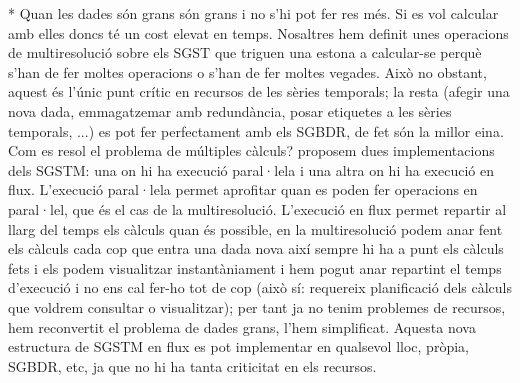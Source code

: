 * Quan les dades són grans són grans i no s'hi pot fer res més. Si es
vol calcular amb elles doncs té un cost elevat en temps. Nosaltres hem
definit unes operacions de multiresolució sobre els SGST que triguen
una estona a calcular-se perquè s'han de fer moltes operacions o s'han
de fer moltes vegades. Això no obstant, aquest és l'únic punt crític
en recursos de les sèries temporals; la resta (afegir una nova dada,
emmagatzemar amb redundància, posar etiquetes a les sèries temporals,
...) es pot fer perfectament amb els SGBDR, de fet són la millor eina.
Com es resol el problema de múltiples càlculs? proposem dues
implementacions dels SGSTM: una on hi ha execució paral·lela i una
altra on hi ha execució en flux.  L'execució paral·lela permet
aprofitar quan es poden fer operacions en paral·lel, que és el cas de
la multiresolució. L'execució en flux permet repartir al llarg del
temps els càlculs quan és possible, en la multiresolució podem anar
fent els càlculs cada cop que entra una dada nova així sempre hi ha a
punt els càlculs fets i els podem visualitzar instantàniament i hem
pogut anar repartint el temps d'execució i no ens cal fer-ho tot de
cop (això sí: requereix planificació dels càlculs que voldrem
consultar o visualitzar); per tant ja no tenim problemes de recursos,
hem reconvertit el problema de dades grans, l'hem simplificat.
Aquesta nova estructura de SGSTM en flux es pot implementar en qualsevol lloc, pròpia, SGBDR, etc, ja que no hi ha tanta criticitat en els recursos. 




















